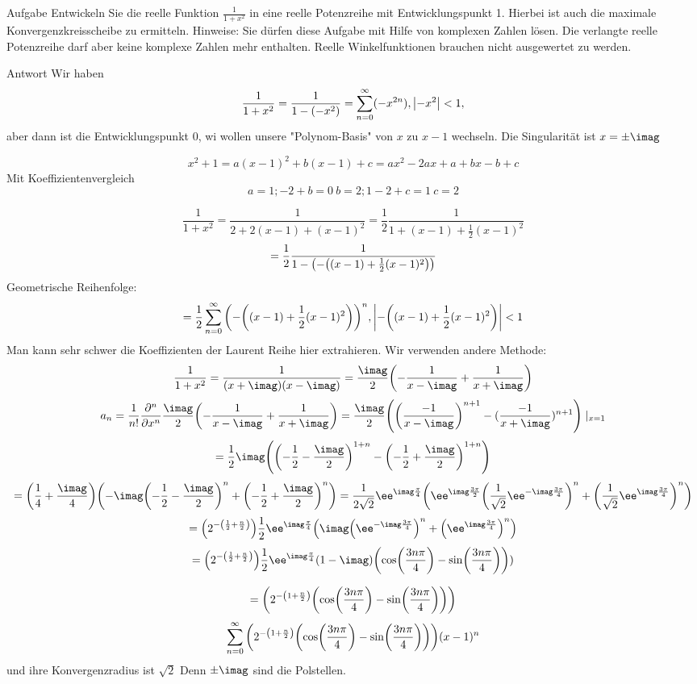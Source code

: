 \documentclass{scrartcl}
\begin{document}
\maketitle
\begin{section}{Aufgabe}%
    Entwickeln Sie die reelle Funktion \( \frac{1}{1+x^{2}} \) in eine reelle Potenzreihe mit Entwicklungspunkt 1. Hierbei ist auch die maximale Konvergenzkreisscheibe zu ermitteln. Hinweise: Sie dürfen diese Aufgabe mit Hilfe von komplexen Zahlen lösen. Die verlangte reelle Potenzreihe darf aber keine komplexe Zahlen mehr enthalten. Reelle Winkelfunktionen brauchen nicht ausgewertet zu werden.
 
\begin{subsection}{Antwort}
Wir haben
\[\frac{1}{1+x^2}=\frac{1}{1-(-x^2)}=\sum_{n=0}^\infty (-x^{2n}), \abs{-x^2}<1,\] aber dann ist die Entwicklungspunkt 0, wi wollen unsere "Polynom-Basis" von $x$ zu $x-1$ wechseln.
Die Singularität ist $x=\pm \imag$

\[x^2+1=a (x-1)^2+b(x-1)+c = a x^2-2ax+a+bx-b+c\]
Mit Koeffizientenvergleich
\[a=1;-2+b=0\>b=2;1-2+c=1\>c=2\]

\[\frac{1}{1+x^2}=\frac{1}{2+2(x-1)+(x-1)^2}=\frac{1}{2}\frac{1}{1+(x-1)+\frac{1}{2}(x-1)^2}\]
\[=\frac{1}{2}\frac{1}{1-\qty(-\qty((x-1)+\frac{1}{2}(x-1)^2))}\]
Geometrische Reihenfolge:
\[=\frac{1}{2}\sum_{n=0}^{\infty}\qty(-\qty((x-1)+\frac{1}{2}(x-1)^2))^n, \qty|-\qty((x-1)+\frac{1}{2}(x-1)^2)|<1\]
Man kann sehr schwer die Koeffizienten der Laurent Reihe hier extrahieren.
Wir verwenden andere Methode:
\[\frac{1}{1+x^2}=\frac{1}{(x+\imag)(x-\imag)}=\frac{\imag}{2}\qty(-\frac{1}{x-\imag}+\frac{1}{x+\imag})\]
\[a_n=\frac{1}{n!}\frac{\partial^n}{\partial x^n}\frac{\imag}{2}\qty(-\frac{1}{x-\imag}+\frac{1}{x+\imag})
=\frac{\imag}{2}\qty(\qty(\frac{-1}{x-\imag})^{n+1}-(\frac{-1}{x+\imag})^{n+1})\mid_{x=1}\]
\[=\frac{1}{2}\imag \qty(\qty(-\frac{1}{2}-\frac{\imag}{2})^{1+n}-\qty(-\frac{1}{2}+\frac{\imag}{2})^{1+n})\]
\[=\qty(\frac{1}{4}+\frac{\imag}{4})\qty(-\imag\qty(-\frac{1}{2}-\frac{\imag}{2})^n+\qty(-\frac{1}{2}+\frac{\imag}{2})^n)
=\frac{1}{2\sqrt{2}}\ee^{\imag\frac{\pi}{4}}\qty(\ee^{\imag\frac{3\pi}{2}}\qty(\frac{1}{\sqrt{2}}\ee^{-\imag \frac{3\pi}{4}})^n+\qty(\frac{1}{\sqrt{2}}\ee^{\imag \frac{3\pi}{4}})^n)\]
\[=\qty(2^{-\qty(\frac{1}{2}+\frac{n}{2})})\frac{1}{2}\ee^{\imag\frac{\pi}{4}}\qty(\imag\qty(\ee^{-\imag \frac{3\pi}{4}})^n+\qty(\ee^{\imag \frac{3\pi}{4}})^n)\]
\[=\qty(2^{-\qty(\frac{1}{2}+\frac{n}{2})})\frac{1}{2}\ee^{\imag\frac{\pi}{4}}(1-\imag)\qty(\cos(\frac{3 n \pi}{4})-\sin(\frac{3 n \pi}{4})))\]

\[=\qty(2^{-\qty(1+\frac{n}{2})}\qty(\cos(\frac{3 n \pi}{4})-\sin(\frac{3 n \pi}{4})))\]
\[\sum_{n=0}^{\infty}\qty(2^{-\qty(1+\frac{n}{2})}\qty(\cos(\frac{3 n \pi}{4})-\sin(\frac{3 n \pi}{4})))(x-1)^n\]
und ihre Konvergenzradius ist $\sqrt{2}$ Denn $\pm \imag$ sind die Polstellen.

\end{subsection}
\end{section}
\end{document}
